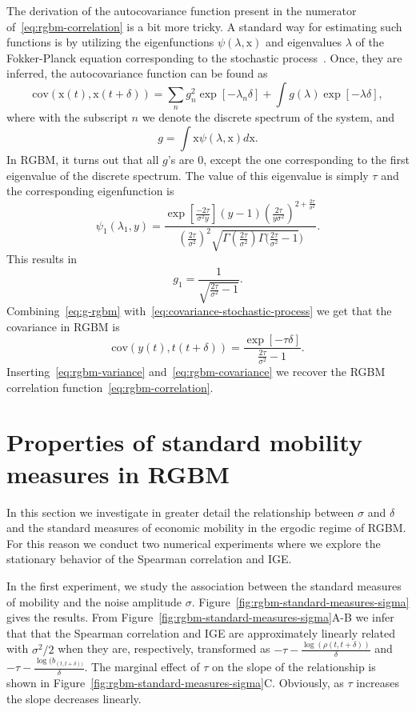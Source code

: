 \documentclass[11pt]{article}
\newcommand{\Fref}[1]{Figure~\ref{fig:#1}}
\newcommand{\be}{\begin{equation}}
\newcommand{\ee}{\end{equation}}
\numberwithin{equation}{section}
\begin{document}
The derivation of the autocovariance function present in the numerator of~\eqref{eq:rgbm-correlation} is a bit more tricky. A standard way for estimating such functions is by utilizing the eigenfunctions $\psi(\lambda,\mathrm{x})$ and eigenvalues $\lambda$ of the Fokker-Planck equation corresponding to the stochastic process~\cite{stratonovich1967topics,risken1996fokker}. Once, they are inferred, the autocovariance function can be found as
\be
\mathrm{cov}(\mathrm{x}(t), \mathrm{x}(t+\delta)) = \sum_n g_n^2 \exp\left[ -\lambda_n \delta \right] + \int g(\lambda)\exp\left[ -\lambda \delta \right],
\label{eq:covariance-stochastic-process}
\ee
where with the subscript $n$ we denote the discrete spectrum of the system, and
\be
g = \int \mathrm{x} \psi(\lambda,\mathrm{x}) d\mathrm{x}.
\ee
In RGBM, it turns out that all $g$'s are 0, except the one corresponding to the first eigenvalue of the discrete spectrum. The value of this eigenvalue is simply $\tau$ and the corresponding eigenfunction is~\cite{LiuSerota2017}
\be
\psi_1(\lambda_1,y) = \frac{\exp\left[\frac{-2\tau}{\sigma^2 y}\right](y-1) (\frac{2\tau}{y \sigma^2})^{2+\frac{2\tau}{\sigma^2}}}{(\frac{2\tau}{\sigma^2})^2\sqrt{\Gamma (\frac{2\tau}{\sigma^2}) \Gamma (\frac{2\tau}{\sigma^2}-1})}.
\label{eq:eigenfunction-rgbm}
\ee
This results in
\be
g_1 = \frac{1}{\sqrt{\frac{2\tau}{\sigma^2}-1}}.
\label{eq:g-rgbm}
\ee
Combining~\eqref{eq:g-rgbm} with~\ref{eq:covariance-stochastic-process} we get that the covariance in RGBM is
\be
\mathrm{cov}(y(t), t(t+\delta)) = \frac{\exp\left[-\tau \delta\right]}{\frac{2\tau}{\sigma^2}-1}.
\label{eq:rgbm-covariance}
\ee
Inserting~\eqref{eq:rgbm-variance} and~\eqref{eq:rgbm-covariance} we recover the RGBM correlation function~\eqref{eq:rgbm-correlation}.

\section{Properties of standard mobility measures in RGBM}\label{sec:properties-standard-mobility-measures}

In this section we investigate in greater detail the relationship between $\sigma$ and $\delta$ and the standard measures of economic mobility in the ergodic regime of RGBM. For this reason we conduct two numerical experiments where we explore the stationary behavior of the Spearman correlation and IGE. 

In the first experiment, we study the association between the standard measures of mobility and the noise amplitude $\sigma$. \Fref{rgbm-standard-measures-sigma} gives the results. From \Fref{rgbm-standard-measures-sigma}A-B we infer that that the Spearman correlation and IGE are approximately linearly related with $\sigma^2/2$ when they are, respectively, transformed as $-\tau - \frac{\log(\rho(t,t+\delta))}{\delta}$ and $-\tau - \frac{\log(b_{(t,t+\delta))}}{\delta}$. The marginal effect of $\tau$ on the slope of the relationship is shown in \Fref{rgbm-standard-measures-sigma}C. Obviously, as $\tau$ increases the slope decreases linearly.
\end{document}
